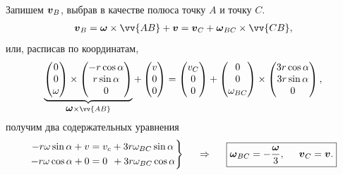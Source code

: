 Запишем $\mbox{\boldmath $v$}_B$, выбрав в качестве полюса точку $A$ и точку $C$.
\begin{align}
\label{vb}
    \vc{v}_{B} = \vc{\omega} \times \vv{AB} + \vc{v} = \vc{v}_{C} + \vc{\omega}_{BC} \times \vv{CB},
\end{align}
или, расписав по координатам,
$$
\underbrace{\begin{pmatrix}
        0 \\ 0 \\ \omega
    \end{pmatrix} \times \begin{pmatrix}
        - r \cos \alpha \\
        r \sin \alpha \\
        0
    \end{pmatrix}}_{\vc{\omega} \times \vv{AB}}
    + \begin{pmatrix}
        v \\
        0 \\
        0
    \end{pmatrix} =
    \begin{pmatrix}
        v_C \\
        0 \\
        0
    \end{pmatrix} +
    \begin{pmatrix}
        0 \\
        0 \\
        \omega_{BC}
    \end{pmatrix} \times
    \begin{pmatrix}
        3r \cos \alpha \\
        3r \sin \alpha \\
        0
    \end{pmatrix},
$$
получим два содержательных уравнения
$$
    \left.\begin{aligned}
        -r\omega \sin \alpha + v &= v_c + 3r \omega_{BC} \sin \alpha \\
        -r\omega \cos \alpha  + 0&= 0 \;\, + 3r \omega_{BC} \cos \alpha
    \end{aligned}\right\}
    \hspace{0.5cm} \Rightarrow \hspace{0.5cm} 
    \boxed{
    \mbox{\boldmath $\omega$}_{BC} = -\frac{\mbox{\boldmath $\omega$}}{3},
    \hspace{0.5cm} \mbox{\boldmath $v$}_C = \mbox{\boldmath $v$}.
    }
$$

\phantom{42}    

